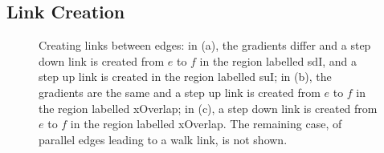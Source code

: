 \documentclass[10pt,twocolumn]{article}
\newenvironment{stusubfig}[1]
{
	\begin{figure}[#1]
	\begin{center}
}
{
	\end{center}
	\end{figure}
}
\begin{document}
\subsection{Link Creation}

\begin{stusubfig}{!t}
        \hspace{4mm}%
        \hspace{4mm}%
\caption{Creating links between edges: in (a), the gradients differ and a step down link is created from $e$ to $f$ in the region labelled sdI, and a step up link is created in the region labelled suI; in (b), the gradients are the same and a step up link is created from $e$ to $f$ in the region labelled xOverlap; in (c), a step down link is created from $e$ to $f$ in the region labelled xOverlap. The remaining case, of parallel edges leading to a walk link, is not shown.}
\label{fig:linkcreation}
\end{stusubfig}
\end{document}
